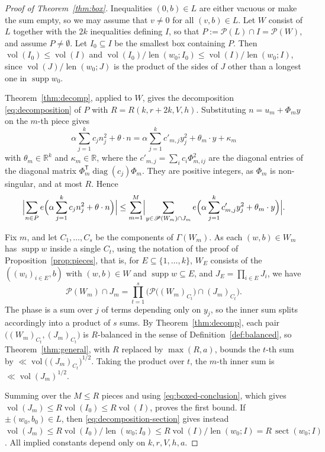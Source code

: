 \documentclass[a4paper,reqno,12pt]{amsart}
\theoremstyle{plain}
\theoremstyle{plain}
\theoremstyle{remark}
\theoremstyle{plain}
\newcommand{\cP}{\mathscr{P}}
\newcommand{\RR}{\mathbb{R}}
\newcommand{\supp}{\operatorname{supp}}
\newcommand{\vol}{\operatorname{vol}}
\newcommand{\len}{\operatorname{len}}
\newcommand{\sect}{\operatorname{sect}}
\theoremstyle{plain}
\theoremstyle{plain}
\begin{document}
{\begin{proof}[Proof of Theorem~\ref{thm:box}]
Inequalities $(0,b)\in L$ are either vacuous or make the sum empty, so we may assume that $v\ne0$ for
all $(v,b)\in L$. Let $W$ consist of $L$ together with the $2k$ inequalities defining $I$, so that
$P:=\cP(L)\cap I=\cP(W)$, and assume $P\ne\emptyset$. Let $I_0\subseteq I$ be the smallest box
containing $P$. Then $\vol(I_0)\le\vol(I)$ and $\vol(I_0)/\len(w_0;I_0)\le\vol(I)/\len(w_0;I)$, since
$\vol(J)/\len(w_0;J)$ is the product of the sides of $J$ other than a longest one in $\supp w_0$.

Theorem~\ref{thm:decomp}, applied to $W$, gives the decomposition \eqref{eq:decomposition} of $P$ with
$R=R(k,r+2k,V,h)$. Substituting $n=u_m+\Phi_my$ on the $m$-th piece gives
\[
 \alpha\sum_{j=1}^k c_jn_j^2+\theta\cdot n
 =\alpha\sum_{j=1}^k c'_{m,j}y_j^2+\theta_m\cdot y+\kappa_m
\]
with $\theta_m\in\RR^k$ and $\kappa_m\in\RR$, where the $c'_{m,j}=\sum_ic_i\Phi_{m,ij}^2$ are the diagonal
entries of the diagonal matrix $\Phi_m^{\mathsf T}\operatorname{diag}(c_j)\Phi_m$. They are positive
integers, as $\Phi_m$ is non-singular, and at most $R$. Hence
\[
 \Bigl|\sum_{n\in P}e\Bigl(\alpha\sum_{j=1}^kc_jn_j^2+\theta\cdot n\Bigr)\Bigr|
 \le\sum_{m=1}^M\Bigl|\sum_{y\in\cP(W_m)\cap J_m}
 e\Bigl(\alpha\sum_{j=1}^kc'_{m,j}y_j^2+\theta_m\cdot y\Bigr)\Bigr|.
\]

Fix $m$, and let $C_1,{\ldots},C_s$ be the components of $\Gamma(W_m)$. As each $(w,b)\in W_m$ has
$\supp w$ inside a single $C_t$, using the notation of the proof of
Proposition~\ref{prop:pieces}, that is, for $E\subseteq\{1,{\ldots},k\}$, $W_E$ consists of the $((w_i)_{i\in E},b)$
with $(w,b)\in W$ and $\supp w\subseteq E$, and $J_E=\prod_{i\in E}J_i$, we have
\[
 \cP(W_m)\cap J_m=\prod_{t=1}^s\bigl(\cP\bigl((W_m)_{C_t}\bigr)\cap(J_m)_{C_t}\bigr).
\]
The phase is a sum over $j$ of terms depending only on $y_j$, so the inner sum splits accordingly into a product of
$s$ sums. By Theorem~\ref{thm:decomp}, each pair $\bigl((W_m)_{C_t},(J_m)_{C_t}\bigr)$ is $R$-balanced
in the sense of Definition~\ref{def:balanced}, so Theorem~\ref{thm:general}, with $R$ replaced by
$\max(R,a)$, bounds the $t$-th sum by $\ll\vol\bigl((J_m)_{C_t}\bigr)^{1/2}$. Taking the product over
$t$, the $m$-th inner sum is $\ll\vol(J_m)^{1/2}$.

Summing over the $M\le R$ pieces and using \eqref{eq:boxed-conclusion}, which gives
$\vol(J_m)\le R\vol(I_0)\le R\vol(I)$, proves the first bound. If $\pm(w_0,b_0)\in L$, then
\eqref{eq:decomposition-section} gives instead
$\vol(J_m)\le R\vol(I_0)/\len(w_0;I_0)\le R\vol(I)/\len(w_0;I)=R\,\sect(w_0;I)$. All
implied constants depend only on $k,r,V,h,a$.
\end{proof}
}
\end{document}
